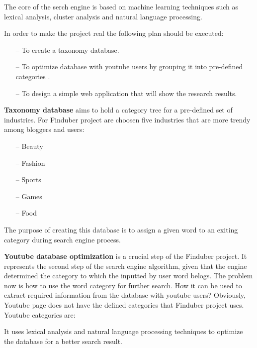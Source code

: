 The core of the serch engine is based on machine learning techniques such as lexical analysis, cluster analysis and natural language processing.

In order to make the project real the following plan should be executed:

\begin{enumerate}

\item[--] To create a taxonomy database. 

\item[--] To optimize database with youtube users by grouping it into pre-defined categories .

\item[--] To design a simple web application that will show the research results. 

\end{enumerate}

\textbf{Taxonomy database} aims to hold a category tree for a pre-defined set of industries. For Finduber project are choosen five industries that are more trendy among bloggers and users:

\begin{enumerate}
\item[--] Beauty
\item[--] Fashion
\item[--] Sports
\item[--] Games
\item[--] Food
\end{enumerate}

The purpose of creating this database is to assign a given word to an exiting category during search engine process.

\textbf{Youtube database optimization} is a crucial step of the Finduber project. It represents the second step of the search engine algorithm, given that the engine determined the category to which the inputted by user word belogs. The problem now is how to use the word category for further search. How it can be used to extract required information from the database with youtube users? Obviously, Youtube page does not have the defined categories that Finduber project uses. Youtube categories are: 

 It uses lexical analysis and natural language processing techniques to optimize the database for a better search result. 

